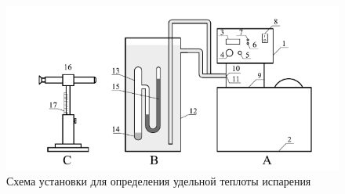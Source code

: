 \documentclass[12pt]{article}
\begin{document}
    \begin{figure}[h!]
        \centering
        \includegraphics[scale=1]{stand.png}
        \caption{Схема установки для определения удельной теплоты испарения}
        \label{stand}
    \end{figure}
    
\end{document}
